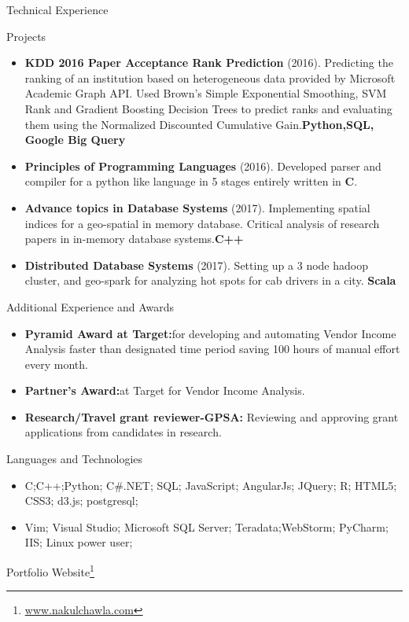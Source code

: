 \documentclass[]{nakulcv}
\begin{document}
	\begin{cvsection}{Technical Experience}
		\begin{cvsubsection}{Projects}{}{}
			\begin{itemize}
				\item \textbf{KDD 2016 Paper Acceptance Rank Prediction} (2016). Predicting the ranking of an institution based on heterogeneous data provided by Microsoft Academic Graph API. Used Brown's Simple Exponential Smoothing, SVM Rank and Gradient Boosting Decision Trees to predict ranks and evaluating them using the Normalized Discounted Cumulative Gain.\textbf{Python,SQL, Google Big Query} 
				\item \textbf{Principles of Programming Languages} (2016). Developed parser and compiler for a python like language in 5 stages entirely written in \textbf{C}.
				\item \textbf{Advance topics in Database Systems} (2017). Implementing spatial indices for a geo-spatial in memory database. Critical analysis of research papers in in-memory database systems.\textbf{C++}
				\item \textbf{Distributed Database Systems} (2017). Setting up a 3 node hadoop cluster, and geo-spark for analyzing hot spots for cab drivers in a city. \textbf{Scala}
			\end{itemize}
		\end{cvsubsection}
	\end{cvsection}
	\begin{cvsection}{Additional Experience and Awards}
		\begin{cvsubsection}{}{}{}	
			\begin{itemize}
				\item \textbf{Pyramid Award at Target:}for developing and automating Vendor Income Analysis faster than designated time period saving 100 hours of manual effort every month.
				\item \textbf{Partner's Award:}at Target for Vendor Income Analysis. 
				\item \textbf{Research/Travel grant reviewer-GPSA:} Reviewing and approving grant applications from candidates in research. 
			\end{itemize}
		\end{cvsubsection}
	\end{cvsection}
	\begin{cvsection}{Languages and Technologies}
		\begin{cvsubsection}{}{}{}	
			\begin{itemize}
				\item C;C++;Python; C\#.NET; SQL; JavaScript; AngularJs; JQuery; R; HTML5; CSS3; d3.js; postgresql;
				\item Vim; Visual Studio; Microsoft SQL Server; Teradata;WebStorm; PyCharm; IIS; Linux power user;
			\end{itemize}
		\end{cvsubsection}
	\end{cvsection}
Portfolio Website\footnote{\url{www.nakulchawla.com}}
\end{document}
